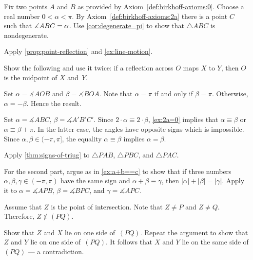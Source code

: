 Fix two points $A$ and $B$ as provided by Axiom~\ref{def:birkhoff-axioms:0}.
Choose a real number $0<\alpha<\pi$.
By Axiom~\ref{def:birkhoff-axioms:2a} there is a point $C$ such that $\measuredangle ABC\z=\alpha$.
Use \ref{cor:degenerate=pi} to show that $\triangle ABC$ is nondegenerate.


Apply \ref{prop:point-reflection} and \ref{ex:line-motion}.

Show the following and use it twice: if a reflection across $O$ maps $X$ to $Y$, then $O$ is the midpoint of $X$ and~$Y$.

\setcounter{eqtn}{0}

Set $\alpha=\measuredangle AOB$ 
and 
$\beta=\measuredangle BOA$.
Note that $\alpha=\pi$ if and only if $\beta=\pi$.
Otherwise, $\alpha=-\beta$.
Hence the result.

Set $\alpha=\measuredangle ABC$, $\beta=\measuredangle A'B'C'$.
Since $2\cdot\alpha\equiv 2\cdot \beta$, \ref{ex:2a=0} implies that
 $\alpha\equiv \beta$ or $\alpha\equiv \beta+\pi$.
In the latter case, the angles have opposite signs which is impossible.
Since $\alpha,\beta\in(-\pi,\pi]$, the equality $\alpha\equiv \beta$ implies $\alpha= \beta$.

Apply \ref{thm:signs-of-triug} to $\triangle PAB$, $\triangle PBC$, and $\triangle PAC$.

For the second part, argue as in \ref{ex:a+b==c} to show that if three numbers $\alpha,\beta,\gamma\in (-\pi,\pi)$ have the same sign and
$\alpha+\beta\equiv\gamma$, then
$|\alpha|+|\beta|=|\gamma|$.
Apply it to $\alpha=\measuredangle APB$,
$\beta=\measuredangle BPC$,
and
$\gamma=\measuredangle APC$.



Assume that $Z$ is the point of intersection.
Note that $Z\ne P$ and $Z\ne Q$.
Therefore, $Z\notin (PQ)$.

Show that $Z$ and $X$ lie on one side of~$(PQ)$.
Repeat the argument to show that $Z$ and $Y$ lie on one side of~$(PQ)$.
It follows that $X$ and $Y$ lie on the same side of $(PQ)$ --- a contradiction.

